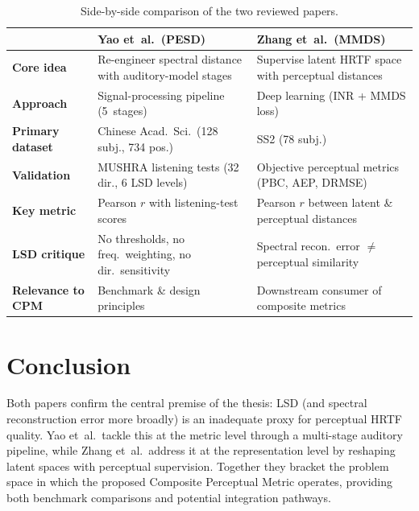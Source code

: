 \documentclass[12pt,a4paper]{article}
\begin{document}
\begin{table}[h]
\centering
\caption{Side-by-side comparison of the two reviewed papers.}
\label{tab:comparison}
\begin{tabular}{@{}p{3.5cm}p{5.5cm}p{5.5cm}@{}}
\toprule
& \textbf{Yao et~al.\ (PESD)} & \textbf{Zhang et~al.\ (MMDS)} \\
\midrule
\textbf{Core idea}
  & Re-engineer spectral distance with auditory-model stages
  & Supervise latent HRTF space with perceptual distances \\[6pt]
\textbf{Approach}
  & Signal-processing pipeline (5~stages)
  & Deep learning (INR + MMDS loss) \\[6pt]
\textbf{Primary dataset}
  & Chinese Acad.\ Sci.\ (128 subj., 734 pos.)
  & SS2 (78 subj.) \\[6pt]
\textbf{Validation}
  & MUSHRA listening tests (32 dir., 6 LSD levels)
  & Objective perceptual metrics (PBC, AEP, DRMSE) \\[6pt]
\textbf{Key metric}
  & Pearson $r$ with listening-test scores
  & Pearson $r$ between latent \& perceptual distances \\[6pt]
\textbf{LSD critique}
  & No thresholds, no freq.\ weighting, no dir.\ sensitivity
  & Spectral recon.\ error $\neq$ perceptual similarity \\[6pt]
\textbf{Relevance to CPM}
  & Benchmark \& design principles
  & Downstream consumer of composite metrics \\
\bottomrule
\end{tabular}
\end{table}


\section{Conclusion}

Both papers confirm the central premise of the thesis: LSD (and spectral
reconstruction error more broadly) is an inadequate proxy for perceptual
HRTF quality.  Yao et~al.\ tackle this at the metric level through a
multi-stage auditory pipeline, while Zhang et~al.\ address it at the
representation level by reshaping latent spaces with perceptual
supervision.  Together they bracket the problem space in which the
proposed Composite Perceptual Metric operates, providing both benchmark
comparisons and potential integration pathways.




\end{document}
